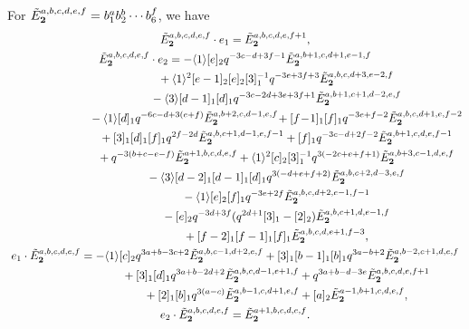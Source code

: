 \documentclass[pdftex]{sigma}
\def\eshort{e_{1}}
\def\elong{e_{2}}
\def\qmq#1{\langle #1 \rangle}
\def\undividedB#1{{\tilde E}^{#1}_{\bf 2}}
\begin{document}
\begin{lemma} \label{lemma:rho-rep-G}
For $\undividedB{a,b,c,d,e,f}=b_1^a b_2^b\cdots b_6^f$, we have
\begin{gather*}
\undividedB{a,b,c,d,e,f} \cdot \eshort=
\undividedB{a,b,c,d,e,f+1},\\
\undividedB{a,b,c,d,e,f} \cdot \elong=
 -\qmq{1} [e]_2 q^{-3 c-d+3 f-1} \undividedB{a,b+1,c,d+1,e-1,f} \\
 \hphantom{\undividedB{a,b,c,d,e,f} \cdot \elong=}{}
 +\qmq{1}^2 [e-1]_2 [e]_2 [3]_1^{-1}q^{-3 e+3 f+3} \undividedB{a,b,c,d+3,e-2,f}\\
 \hphantom{\undividedB{a,b,c,d,e,f} \cdot \elong=}{}
 -\qmq{3} [d-1]_1 [d]_1 q^{-3 c-2 d+3 e+3 f+1} \undividedB{a,b+1,c+1,d-2,e,f}\\
 \hphantom{\undividedB{a,b,c,d,e,f} \cdot \elong=}{}
 -\qmq{1} [d]_1 q^{-6 c-d+3 (e+f)} \undividedB{a,b+2,c,d-1,e,f} \!
  +[f\!-\!1]_1 [f]_1 q^{-3 e+f-2} \undividedB{a,b,c,d+1,e,f-2}\\
\hphantom{\undividedB{a,b,c,d,e,f} \cdot \elong=}{}
 +[3]_1 [d]_1 [f]_1 q^{2 f-2 d} \undividedB{a,b,c+1,d-1,e,f-1}
 +[f]_1 q^{-3 c-d+2 f-2} \undividedB{a,b+1,c,d,e,f-1}\\
\hphantom{\undividedB{a,b,c,d,e,f} \cdot \elong=}{}
 +q^{-3 (b+c-e-f)} \undividedB{a+1,b,c,d,e,f}
 +\qmq{1}^2 [c]_2 [3]_1^{-1}q^{3 (-2 c+e+f+1)} \undividedB{a,b+3,c-1,d,e,f}\\
\hphantom{\undividedB{a,b,c,d,e,f} \cdot \elong=}{}
 -\qmq{3} [d-2]_1 [d-1]_1 [d]_1 q^{3 (-d+e+f+2)} \undividedB{a,b,c+2,d-3,e,f} \\
\hphantom{\undividedB{a,b,c,d,e,f} \cdot \elong=}{}
 -\qmq{1} [e]_2 [f]_1 q^{-3 e+2 f} \undividedB{a,b,c,d+2,e-1,f-1}\\
\hphantom{\undividedB{a,b,c,d,e,f} \cdot \elong=}{}
 -[e]_2 q^{-3 d+3 f} (q^{2d+1} [3]_1-[2]_2) \undividedB{a,b,c+1,d,e-1,f} \\
\hphantom{\undividedB{a,b,c,d,e,f} \cdot \elong=}{}
 +[f-2]_1 [f-1]_1 [f]_1 \undividedB{a,b,c,d,e+1,f-3},\\
\eshort \cdot \undividedB{a,b,c,d,e,f}=
 -\qmq{1} [c]_2 q^{3 a+b-3 c+2} \undividedB{a,b,c-1,d+2,e,f}
 +[3]_1 [b-1]_1 [b]_1 q^{3 a-b+2} \undividedB{a,b-2,c+1,d,e,f}\\
\hphantom{\eshort \cdot \undividedB{a,b,c,d,e,f}=}{}
 +[3]_1 [d]_1 q^{3 a+b-2 d+2} \undividedB{a,b,c,d-1,e+1,f}
 +q^{3 a+b-d-3 e} \undividedB{a,b,c,d,e,f+1}\\
\hphantom{\eshort \cdot \undividedB{a,b,c,d,e,f}=}{}
 +[2]_1 [b]_1 q^{3 (a-c)} \undividedB{a,b-1,c,d+1,e,f}
 +[a]_2 \undividedB{a-1,b+1,c,d,e,f},\\
 \elong \cdot \undividedB{a,b,c,d,e,f}=
\undividedB{a+1,b,c,d,e,f}.
\end{gather*}
\end{lemma}
\end{document}

